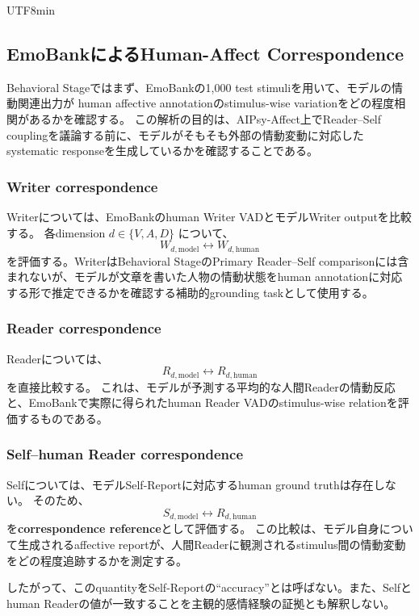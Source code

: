 \documentclass{article} %
\begin{document}
\begin{CJK*}{UTF8}{min}
\subsection{EmoBankによるHuman-Affect Correspondence}
\label{app:behavioral-emobank}

Behavioral Stageではまず、EmoBankの1,000 test stimuliを用いて、モデルの情動関連出力が
human affective annotationのstimulus-wise variationをどの程度相関があるかを確認する。
この解析の目的は、AIPsy-Affect上でReader--Self couplingを議論する前に、モデルがそもそも外部の情動変動に対応したsystematic responseを生成しているかを確認することである。


\subsubsection{Writer correspondence}

Writerについては、EmoBankのhuman Writer VADとモデルWriter outputを比較する。
各dimension \(d\in\{V,A,D\}\) について、
\[
W_{d,\mathrm{model}}
\leftrightarrow
W_{d,\mathrm{human}}
\]
を評価する。WriterはBehavioral StageのPrimary Reader--Self comparisonには含まれないが、モデルが文章を書いた人物の情動状態をhuman annotationに対応する形で推定できるかを確認する補助的grounding taskとして使用する。


\subsubsection{Reader correspondence}

Readerについては、
\[
R_{d,\mathrm{model}}
\leftrightarrow
R_{d,\mathrm{human}}
\]
を直接比較する。
これは、モデルが予測する平均的な人間Readerの情動反応と、EmoBankで実際に得られたhuman Reader VADのstimulus-wise relationを評価するものである。


\subsubsection{Self--human Reader correspondence}

Selfについては、モデルSelf-Reportに対応するhuman ground truthは存在しない。
そのため、
\[
S_{d,\mathrm{model}}
\leftrightarrow
R_{d,\mathrm{human}}
\]
を\textbf{correspondence reference}として評価する。
この比較は、モデル自身について生成されるaffective reportが、人間Readerに観測されるstimulus間の情動変動をどの程度追跡するかを測定する。

したがって、このquantityをSelf-Reportの``accuracy''とは呼ばない。また、Selfとhuman Readerの値が一致することを主観的感情経験の証拠とも解釈しない。



\end{CJK*}
\end{document}
